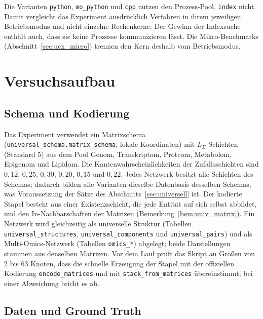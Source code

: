 \documentclass[a4paper,12pt, twoside]{report}
\theoremstyle{definition}
\begin{document}
Die Varianten \texttt{python}, \texttt{mo\_python} und \texttt{cpp} nutzen den Prozess-Pool, \texttt{index} nicht. Damit vergleicht das Experiment ausdrücklich Verfahren in ihrem jeweiligen Betriebsmodus und nicht einzelne Rechenkerne: Der Gewinn der Indexsuche enthält auch, dass sie keine Prozesse kommunizieren lässt. Die Mikro-Benchmarks (Abschnitt~\ref{sec:ucx_micro}) trennen den Kern deshalb vom Betriebsmodus.

\section{Versuchsaufbau}
\label{sec:ucx_aufbau}

\subsection{Schema und Kodierung}

Das Experiment verwendet ein Matrixschema (\texttt{universal\_schema.matrix\_schema}, lokale Koordinaten) mit $L_\Sigma$ Schichten (Standard $5$) aus dem Pool Genom, Transkriptom, Proteom, Metabolom, Epigenom und Lipidom. Die Kantenwahrscheinlichkeiten der Zufallsschichten sind $0{,}12$, $0{,}25$, $0{,}30$, $0{,}20$, $0{,}15$ und $0{,}22$. Jedes Netzwerk besitzt alle Schichten des Schemas; dadurch bilden alle Varianten dieselbe Datenbasis desselben Schemas, was Voraussetzung der Sätze des Abschnitts~\ref{sec:universell} ist. Der kodierte Stapel besteht aus einer Existenzschicht, die jede Entität auf sich selbst abbildet, und den In-Nachbarschaften der Matrizen (Bemerkung~\ref{bem:univ_matrix}). Ein Netzwerk wird gleichzeitig als universelle Struktur (Tabellen \texttt{universal\_structures}, \texttt{universal\_components} und \texttt{universal\_pairs}) und als Multi-Omics-Netzwerk (Tabellen \texttt{omics\_*}) abgelegt; beide Darstellungen stammen aus denselben Matrizen. Vor dem Lauf prüft das Skript an Größen von $2$ bis $63$ Knoten, dass die schnelle Erzeugung der Stapel mit der offiziellen Kodierung \texttt{encode\_matrices} und mit \texttt{stack\_from\_matrices} übereinstimmt; bei einer Abweichung bricht es ab.

\subsection{Daten und Ground Truth}
\end{document}
